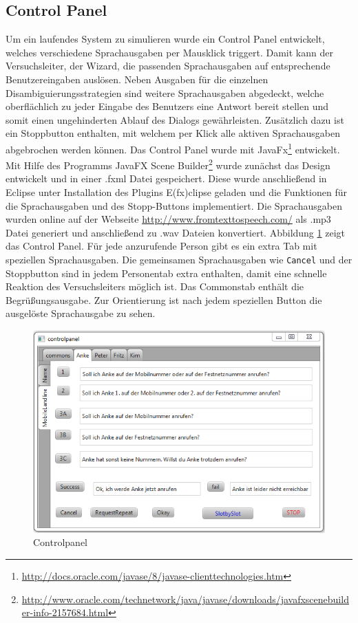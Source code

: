 \documentclass[12pt,a4paper]{scrartcl}
\begin{document}
\subsection{Control Panel}
Um ein laufendes System zu simulieren wurde ein Control Panel entwickelt, welches verschiedene Sprachausgaben per Mausklick triggert. Damit kann der Versuchsleiter, der Wizard, die passenden Sprachausgaben auf entsprechende Benutzereingaben auslösen. Neben Ausgaben für die einzelnen Disambiguierungsstrategien sind weitere Sprachausgaben abgedeckt, welche oberflächlich zu jeder Eingabe des Benutzers eine Antwort bereit stellen und somit einen ungehinderten Ablauf des Dialogs gewährleisten. Zusätzlich dazu ist ein Stoppbutton enthalten, mit welchem per Klick alle aktiven Sprachausgaben abgebrochen werden können. 
Das Control Panel wurde mit JavaFx\footnote{\label{foot:javafx}\url{http://docs.oracle.com/javase/8/javase-clienttechnologies.htm}} entwickelt. Mit Hilfe des Programms JavaFX Scene Builder\footnote{\label{foot:fxsb}\url{http://www.oracle.com/technetwork/java/javase/downloads/javafxscenebuilder-info-2157684.html}} wurde zunächst das Design entwickelt und in einer .fxml Datei gespeichert. Diese wurde anschließend in Eclipse unter Installation des Plugins E(fx)clipse geladen und die Funktionen für die Sprachausgaben und des Stopp-Buttons implementiert. Die Sprachausgaben wurden online auf der Webseite \url{http://www.fromtexttospeech.com/} als .mp3 Datei generiert und anschließend zu .wav Dateien konvertiert. 
Abbildung \ref{cp1} zeigt das Control Panel. Für jede anzurufende Person gibt es ein extra Tab mit speziellen Sprachausgaben. Die gemeinsamen Sprachausgaben wie \texttt{Cancel} und der Stoppbutton sind in jedem Personentab extra enthalten, damit eine schnelle Reaktion des Versuchsleiters möglich ist. Das Commonstab enthält die Begrüßungsausgabe. Zur Orientierung ist nach jedem speziellen Button die ausgelöste Sprachausgabe zu sehen. 
\begin{figure}[htbp]
\includegraphics{controlpanel.png}
\caption{Controlpanel}
\label{cp1}
\end{figure}
\end{document}
